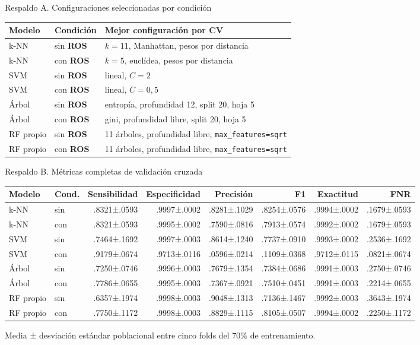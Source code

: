 \documentclass[aspectratio=169,10pt]{beamer}
\newcommand{\ros}{\textbf{ROS}}
\begin{document}
\begin{frame}{Respaldo A. Configuraciones seleccionadas por condición}
  \scriptsize
  \renewcommand{\arraystretch}{1.13}
  \begin{tabular}{llp{}}
    \toprule
    Modelo & Condición & Mejor configuración por CV \\
    \midrule
    k-NN & sin \ros{} & \(k=11\), Manhattan, pesos por distancia \\
    k-NN & con \ros{} & \(k=5\), euclídea, pesos por distancia \\
    SVM & sin \ros{} & lineal, \(C=2\) \\
    SVM & con \ros{} & lineal, \(C=0{,}5\) \\
    Árbol & sin \ros{} & entropía, profundidad 12, split 20, hoja 5 \\
    Árbol & con \ros{} & gini, profundidad libre, split 20, hoja 5 \\
    RF propio & sin \ros{} & 11 árboles, profundidad libre, \texttt{max\_features=sqrt} \\
    RF propio & con \ros{} & 11 árboles, profundidad libre, \texttt{max\_features=sqrt} \\
    \bottomrule
  \end{tabular}
\end{frame}

\begin{frame}{Respaldo B. Métricas completas de validación cruzada}
  \centering
  \fontsize{5.6}{6.7}\selectfont
  \renewcommand{\arraystretch}{1.16}
  \begin{tabular}{llrrrrrr}
    \toprule
    Modelo & Cond. & Sensibilidad & Especificidad & Precisión & F1 & Exactitud & FNR \\
    \midrule
    k-NN & sin & .8321±.0593 & .9997±.0002 & .8281±.1029 & .8254±.0576 & .9994±.0002 & .1679±.0593 \\
    k-NN & con & .8321±.0593 & .9995±.0002 & .7590±.0816 & .7913±.0574 & .9992±.0002 & .1679±.0593 \\
    SVM & sin & .7464±.1692 & .9997±.0003 & .8614±.1240 & .7737±.0910 & .9993±.0002 & .2536±.1692 \\
    SVM & con & .9179±.0674 & .9713±.0116 & .0596±.0214 & .1109±.0368 & .9712±.0115 & .0821±.0674 \\
    Árbol & sin & .7250±.0746 & .9996±.0003 & .7679±.1354 & .7384±.0686 & .9991±.0003 & .2750±.0746 \\
    Árbol & con & .7786±.0655 & .9995±.0003 & .7367±.0921 & .7510±.0451 & .9991±.0003 & .2214±.0655 \\
    RF propio & sin & .6357±.1974 & .9998±.0003 & .9048±.1313 & .7136±.1467 & .9992±.0003 & .3643±.1974 \\
    RF propio & con & .7750±.1172 & .9998±.0003 & .8829±.1115 & .8105±.0507 & .9994±.0002 & .2250±.1172 \\
    \bottomrule
  \end{tabular}

  \vspace{.7em}
  \small Media ± desviación estándar poblacional entre cinco folds del 70\% de entrenamiento.
\end{frame}
\end{document}
